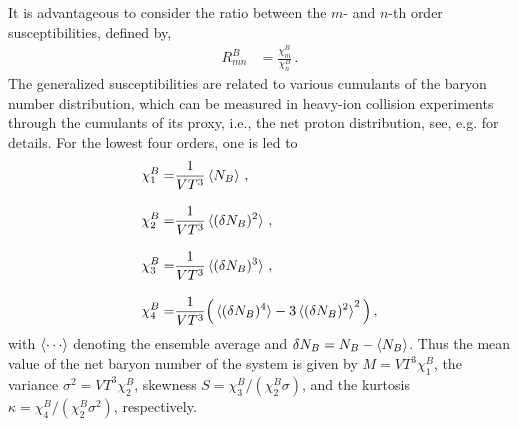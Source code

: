 \documentclass[%
reprint,
superscriptaddress,
showpacs,preprintnumbers,
amsmath,amssymb,
aps,
prd,
]{revtex4-1}
\begin{document}
%
It is advantageous to consider the ratio between the $m$- and $n$-th order susceptibilities, defined by,   
%
\begin{align}
R_{mn}^{B}&=\frac{\chi_m^{B}}{\chi_n^{B}}\,.\label{eq:Rmn}
\end{align}
%
The generalized susceptibilities are related to various cumulants of the baryon number distribution, which can be measured in heavy-ion collision experiments through the cumulants of its proxy, i.e., the net proton distribution, see, e.g. \cite{Luo:2017faz} for details. For the lowest four orders, one is led to
%
\begin{align}
\chi^B_1=&\frac{1}{VT^3}\braket{N_B}\,,\label{eq:chiB1}\\[2ex]
\chi^B_2=& \frac{1}{VT^3}\braket{(\delta N_B)^2}\,,\label{eq:chiB2}\\[2ex]
\chi^B_3=&\frac{1}{VT^3}\braket{(\delta N_B)^3}\,,\\[2ex]
\chi^B_4=&\frac{1}{VT^3}\Big(\braket{(\delta N_B)^4}-3\braket{(\delta N_B)^2}^2\Big)\,,\label{eq:chiB4}
\end{align}
%
with $\braket{\cdots}$ denoting the ensemble average and $\delta N_B=N_B-\braket{N_B}$. Thus the mean value of the net baryon number of the system is given by $M=VT^3\chi_1^{B}$, the variance $\sigma^2=VT^3\chi_2^{B}$, skewness $S=\chi_3^{B}/(\chi_2^{B}\sigma)$, and the kurtosis $\kappa=\chi_4^{B}/(\chi_2^{B}\sigma^2)$, respectively.

	
\end{document}
